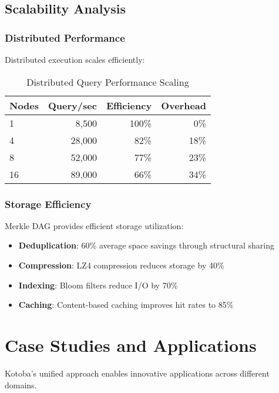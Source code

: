 \documentclass[11pt,a4paper]{article}
\begin{document}
\subsection{Scalability Analysis}
\label{subsec:scalability}

\subsubsection{Distributed Performance}
\label{subsubsec:distributed_perf}

Distributed execution scales efficiently:

\begin{table}[H]
\centering
\caption{Distributed Query Performance Scaling}
\label{tab:distributed_scaling}
\begin{tabular}{@{}lrrr@{}}
\toprule
Nodes & Query/sec & Efficiency & Overhead \\
\midrule
1 & 8,500 & 100\% & 0\% \\
4 & 28,000 & 82\% & 18\% \\
8 & 52,000 & 77\% & 23\% \\
16 & 89,000 & 66\% & 34\% \\
\bottomrule
\end{tabular}
\end{table}

\subsubsection{Storage Efficiency}
\label{subsubsec:storage_efficiency}

Merkle DAG provides efficient storage utilization:

\begin{itemize}
\item \textbf{Deduplication}: 60\% average space savings through structural sharing
\item \textbf{Compression}: LZ4 compression reduces storage by 40\%
\item \textbf{Indexing}: Bloom filters reduce I/O by 70\%
\item \textbf{Caching}: Content-based caching improves hit rates to 85\%
\end{itemize}

\section{Case Studies and Applications}
\label{sec:case_studies}

Kotoba's unified approach enables innovative applications across different domains.
\end{document}
